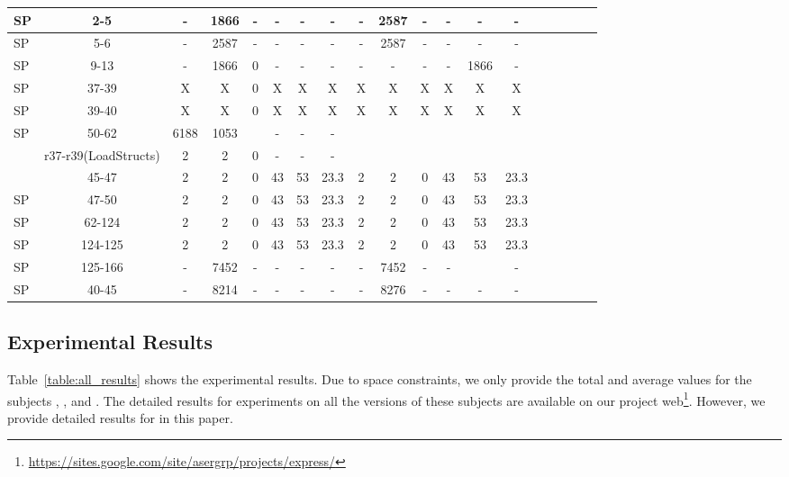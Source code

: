 \begin{table*}
\begin{CodeOut}
\begin{center}
\begin {tabular} {|l|c|c|c|c|c|c|c|c|c|c|c|c|c|c|c|c|c|c|}
\hline
SP&2-5&-&1866&-&-&-&-&-&2587&-&-&-&-\\
\hline
SP&5-6&-&2587&-&-&-&-&-&2587&-&-&-&-\\
\hline
SP&9-13&-&1866&0&-&-&-&-&-&-&-&1866&-\\
\hline
SP&37-39&X&X&0&X&X&X&X&X&X&X&X&X\\
\hline
SP&39-40&X&X&0&X&X&X&X&X&X&X&X&X\\
\hline
SP&50-62&6188&1053&&-&-&-&&&&&&\\
\hline
\Comment{SP&r37-r39(LoadStructs)&2&2&0&-&-&-&&&&&&\\
\hline}
SP&45-47&2&2&0&43&53&23.3&2&2&0&43&53&23.3\\
\hline
SP&47-50&2&2&0&43&53&23.3&2&2&0&43&53&23.3\\
\hline
SP&62-124&2&2&0&43&53&23.3&2&2&0&43&53&23.3\\
\hline
SP&124-125&2&2&0&43&53&23.3&2&2&0&43&53&23.3\\
\hline
SP&125-166&-&7452&-&-&-&-&-&7452&-&-&&-\\
\hline
SP&40-45&-&8214&-&-&-&-&-&8276&-&-&-&-\\
\hline
\end{tabular}
\end{center}
\end{CodeOut}
\vspace{- 0.35 in}
\end{table*}


\subsection{Experimental Results}
Table~\ref{table:all_results} shows the experimental results. Due to space constraints, we only provide the total and average values for the subjects , , and . The detailed results for experiments on all the versions of these subjects are available on our project web\footnote{\url{https://sites.google.com/site/asergrp/projects/express/}}.
However, we provide detailed results for  in this paper. 

